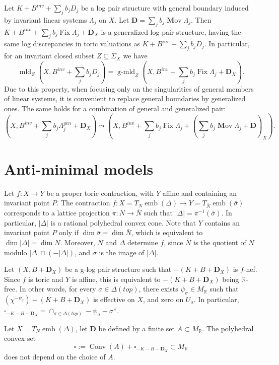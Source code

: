 \documentclass[12pt,twoside]{amsart}
\newcommand{\R}{{\mathbb R}}
\newcommand{\bD}{{\mathbf D}}
\newcommand{\Conv}{\operatorname{Conv}}
\newcommand{\emb}{\operatorname{emb}}
\newcommand{\Fix}{\operatorname{Fix}}
\newcommand{\mld}{\operatorname{mld}}
\newcommand{\gmld}{\operatorname{g-mld}}
\newcommand{\bMov}{\operatorname{{\mathbf Mov}}}
\theoremstyle{plain}
\theoremstyle{definition}
\theoremstyle{remark}
\begin{document}
Let $K+B^{inv}+\sum_jb_jD_j$ be a log pair structure with general boundary
induced by invariant linear systems $\Lambda_j$ on $X$. 
Let $\bD=\sum_j b_j\bMov \Lambda_j$.
Then $K+B^{inv}+\sum_j b_j\Fix\Lambda_j+\bD_X$ is a generalized log pair 
structure, having the same log discrepancies in toric valuations as 
$K+B^{inv}+\sum_jb_jD_j$. In particular, for an invariant closed subset $Z\subseteq \Sigma_X$
we have 
$$
\mld_Z(X,B^{inv}+\sum_jb_jD_j)=\gmld_Z(X,B^{inv}+\sum_j b_j\Fix\Lambda_j+\bD_X).
$$
Due to this property, when focusing only on the singularities of general members 
of linear systems, it is convenient to replace general boundaries by generalized ones.
The same holds for a combination of general and generalized pair: 
$$
(X,B^{inv}+\sum_jb_j\Lambda_j^{gen}+\bD_X) \leadsto
(X,B^{inv}+\sum_j b_j\Fix \Lambda_j+(\sum_jb_j\bMov \Lambda_j+\bD)_X).
$$


\section{Anti-minimal models}


Let $f\colon X\to Y$ be a proper toric contraction, with $Y$ affine and containing an invariant point $P$. 
The contraction $f\colon X=T_N\emb(\Delta)\to Y=T_{\bar{N}}\emb(\bar{\sigma})$ corresponds to 
a lattice projection $\pi\colon N\to \bar{N}$ such that $|\Delta|=\pi^{-1}(\bar{\sigma})$.
In particular, $|\Delta|$ is a rational polyhedral convex cone.
Note that $Y$ contains an invariant point $P$ only if $\dim \bar{\sigma}=\dim \bar{N}$,
which is equivalent to $\dim |\Delta| =\dim N$. Moreover, $N$ and $\Delta$ determine
$f$, since $\bar{N}$ is the quotient of $N$ modulo $|\Delta|\cap (-|\Delta|)$, and 
$\bar{\sigma}$ is the image of $|\Delta|$.

Let $(X,B+\bD_X)$ be a g-log pair structure such that $-(K+B+\bD_X)$ 
is $f$-nef. Since $f$ is toric and $Y$ is affine, this is equivalent to $-(K+B+\bD_X)$ being 
$\R$-free. In other words, for every $\sigma\in \Delta(top)$, there exists 
$\psi_\sigma\in M_\R$ such that $(\chi^{-\psi_\sigma})-(K+B+\bD_X)$ is effective on $X$,
and zero on $U_\sigma$. In particular,
$\square_{-K-B-\bD_X}=\cap_{\sigma\in \Delta(top)}-\psi_\sigma+\sigma^\vee$.

Let $X=T_N\emb(\Delta)$, let $\bD$ be defined by a finite set $A\subset M_\R$. 
The polyhedral convex set
$$
\square:=\Conv(A)+\square_{-K-B-\bD_X}\subset M_\R
$$
does not depend on the choice of $A$.
\end{document}
